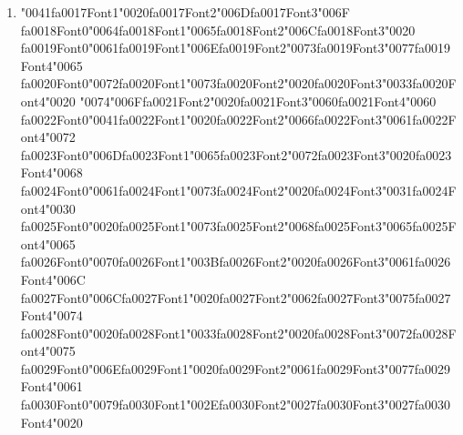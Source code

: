 \documentclass[12pt]{article}
\begin{document}
\begin{enumerate}[label=Q\arabic*.]
\begin{enumerate}[label=(\Alph*)]
    \item HotpotQA (generative multi-hop answers)
    \item HumanEval (code generation via execution)
    \item SQuAD (extractive span selection)
    \item MMLU (multiple-choice benchmark)
\end{enumerate}
\item {\char"0041}{\csname fa0017Font1\endcsname\char"0020}{\csname fa0017Font2\endcsname\char"006D}{\csname fa0017Font3\endcsname\char"006F} {\csname fa0018Font0\endcsname\char"0064}{\csname fa0018Font1\endcsname\char"0065}{\csname fa0018Font2\endcsname\char"006C}{\csname fa0018Font3\endcsname\char"0020} {\csname fa0019Font0\endcsname\char"0061}{\csname fa0019Font1\endcsname\char"006E}{\csname fa0019Font2\endcsname\char"0073}{\csname fa0019Font3\endcsname\char"0077}{\csname fa0019Font4\endcsname\char"0065} {\csname fa0020Font0\endcsname\char"0072}{\csname fa0020Font1\endcsname\char"0073}{\csname fa0020Font2\endcsname\char"0020}{\csname fa0020Font3\endcsname\char"0033}{\csname fa0020Font4\endcsname\char"0020} {\char"0074}{\char"006F}{\csname fa0021Font2\endcsname\char"0020}{\csname fa0021Font3\endcsname\char"0060}{\csname fa0021Font4\endcsname\char"0060} {\csname fa0022Font0\endcsname\char"0041}{\csname fa0022Font1\endcsname\char"0020}{\csname fa0022Font2\endcsname\char"0066}{\csname fa0022Font3\endcsname\char"0061}{\csname fa0022Font4\endcsname\char"0072} {\csname fa0023Font0\endcsname\char"006D}{\csname fa0023Font1\endcsname\char"0065}{\csname fa0023Font2\endcsname\char"0072}{\csname fa0023Font3\endcsname\char"0020}{\csname fa0023Font4\endcsname\char"0068} {\csname fa0024Font0\endcsname\char"0061}{\csname fa0024Font1\endcsname\char"0073}{\csname fa0024Font2\endcsname\char"0020}{\csname fa0024Font3\endcsname\char"0031}{\csname fa0024Font4\endcsname\char"0030} {\csname fa0025Font0\endcsname\char"0020}{\csname fa0025Font1\endcsname\char"0073}{\csname fa0025Font2\endcsname\char"0068}{\csname fa0025Font3\endcsname\char"0065}{\csname fa0025Font4\endcsname\char"0065} {\csname fa0026Font0\endcsname\char"0070}{\csname fa0026Font1\endcsname\char"003B}{\csname fa0026Font2\endcsname\char"0020}{\csname fa0026Font3\endcsname\char"0061}{\csname fa0026Font4\endcsname\char"006C} {\csname fa0027Font0\endcsname\char"006C}{\csname fa0027Font1\endcsname\char"0020}{\csname fa0027Font2\endcsname\char"0062}{\csname fa0027Font3\endcsname\char"0075}{\csname fa0027Font4\endcsname\char"0074} {\csname fa0028Font0\endcsname\char"0020}{\csname fa0028Font1\endcsname\char"0033}{\csname fa0028Font2\endcsname\char"0020}{\csname fa0028Font3\endcsname\char"0072}{\csname fa0028Font4\endcsname\char"0075} {\csname fa0029Font0\endcsname\char"006E}{\csname fa0029Font1\endcsname\char"0020}{\csname fa0029Font2\endcsname\char"0061}{\csname fa0029Font3\endcsname\char"0077}{\csname fa0029Font4\endcsname\char"0061} {\csname fa0030Font0\endcsname\char"0079}{\csname fa0030Font1\endcsname\char"002E}{\csname fa0030Font2\endcsname\char"0027}{\csname fa0030Font3\endcsname\char"0027}{\csname fa0030Font4\endcsname\char"0020} 
\end{enumerate}
\end{document}
